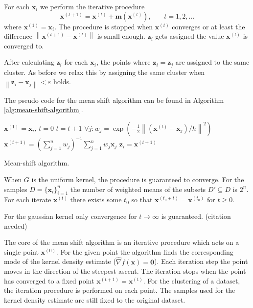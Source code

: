 \documentclass{article}
\newcommand{\norm}[1]{\left\lVert#1\right\rVert}
\begin{document}
For each $\bm{x}_i$ we perform the iterative procedure
\begin{equation}
\bm{x}^{(t+1)} = \bm{x}^{(t)} + \bm{m}(\bm{x}^{(t)})\text{,}\qquad t = 1, 2, ...
\end{equation}
where $\bm{x}^{(1)} = \bm{x}_i$. The procedure is stopped when $\bm{x}^{(t)}$ converges or at least the difference $\norm{\bm{x}^{(t+1)} - \bm{x}^{(t)}}$ is small enough. $\bm{z}_i$ gets assigned the value $\bm{x}^{(t)}$ is converged to.

After calculating $\bm{z}_i$ for each $\bm{x}_i$, the points where $\bm{z}_i = \bm{z}_j$ are assigned to the same cluster. As before we relax this by assigning the same cluster when $\norm{\bm{z}_i - \bm{x}_j} < \varepsilon$ holds.

The pseudo code for the mean shift algorithm can be found in Algorithm \ref{alg:mean-shift-algorithm}.
\begin{algorithm}
	\begin{algorithmic}[1]
		\State $\bm{x}^{(1)} = \bm{x}_i$, $t=0$
		\Repeat
		\State $t = t + 1$
		\State $\forall j: w_j = \exp(-\frac{1}{2} \norm{(\bm{x}^{(t)} - \bm{x}_j) / h}^2)$
		\State $\bm{x}^{(t+1)} = (\sum_{j=1}^n w_j)^{-1} \sum_{j=1}^n w_j \bm{x}_j$
		\Until{$\norm{\bm{x}^{(t+1)} - \bm{x}^{(t)}} < tol$}
		\State $\bm{z}_i = \bm{x}^{(t+1)}$
		\EndFor
		\State \Return {}
		\EndFunction
	\end{algorithmic}
	\caption{Mean-shift algorithm.}
	\label{alg:mean-shift-algorithm}
\end{algorithm}

When $G$ is the uniform kernel, the procedure is guaranteed to converge. For the samples $D = \{\bm{x}_i\}_{i=1}^n$ the number of weighted means of the subsets $D' \subseteq D$ is $2^n$. For each iterate $\bm{x}^{(t)}$ there exists some $t_0$ so that $\bm{x}^{(t_0 + t)} = \bm{x}^{(t_0)}$ for $t \geq 0$.

For the gaussian kernel only convergence for $t \rightarrow \infty$ is guaranteed. (citation needed)


The core of the mean shift algorithm is an iterative procedure which acts on a single point $\bm{x}^{(0)}$. For the given point the algorithm finds the corresponding mode of the kernel density estimate ($\hat\nabla f(\bm{x}) = \bm{0}$). Each iteration step the point moves in the direction of the steepest ascent. The iteration stops when the point has converged to a fixed point $\bm{x}^{(t+1)} = \bm{x}^{(t)}$. For the clustering of a dataset, the iteration procedure is performed on each point. The samples used for the kernel density estimate are still fixed to the original dataset.
\end{document}
